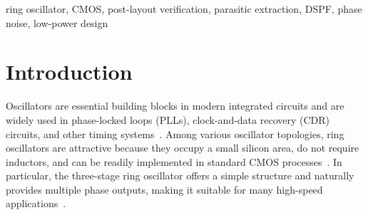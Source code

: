 \documentclass[conference,a4paper]{IEEEtran} %
\begin{document}
\begin{abstract}
This paper reports the physical implementation and parasitic-aware post-layout
characterization of a low-power three-stage CMOS ring oscillator implemented in
a 65-nm Low-Power (LP) CMOS process. Operating from a 1.0-V supply, the
oscillator is physically implemented using custom layout techniques with a
compact active area of $73.96~\mu\text{m}^2$. Following successful design rule
checking (DRC), Layout Versus Schematic (LVS) verification, and detailed
standard parasitic format (DSPF) extraction, post-layout Periodic Steady State
(PSS) and periodic noise (\texttt{pnoise}) analyses are performed to
characterize the oscillator under realistic conditions. The extracted design
achieves a stable oscillation frequency of 6.50~GHz while consuming only
$286.3~\mu$W from a 1.0-V supply. The simulated single-sideband phase noise is
$-77.6$~dBc/Hz at a 1-MHz offset, corresponding to a figure of merit (FoM) of
$-159.3$~dBc/Hz. The comparison between schematic and post-layout simulations
highlights the significant influence of distributed interconnect parasitics on
oscillator performance, emphasizing the importance of parasitic-aware physical
verification in nanoscale CMOS circuits. The results provide a concrete
reference point for the parasitic budget that must be anticipated when designing
low-power multi-gigahertz oscillators in nanoscale CMOS.
\end{abstract}

\begin{IEEEkeywords}
ring oscillator, CMOS, post-layout verification, parasitic extraction, DSPF, phase noise, low-power design
\end{IEEEkeywords}

\section{Introduction}
Oscillators are essential building blocks in modern integrated circuits and are
widely used in phase-locked loops (PLLs), clock-and-data recovery (CDR)
circuits, and other timing systems~\cite{maneatis_dll}. Among various oscillator
topologies, ring oscillators are attractive because they occupy a small silicon
area, do not require inductors, and can be readily implemented in standard CMOS
processes~\cite{razavi_analog, lee_cmos}. In particular, the three-stage ring
oscillator offers a simple structure and naturally provides multiple phase
outputs, making it suitable for many high-speed
applications~\cite{maneatis_coupled, nugroho_ring}.
\end{document}
